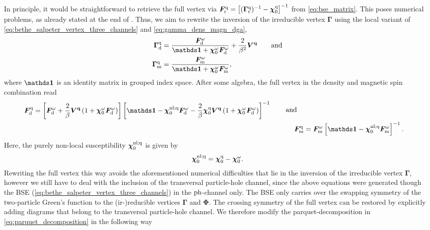 \documentclass[../../main.tex]{subfiles}
\begin{document}
In principle, it would be straightforward to retrieve the full vertex via $\bm F_{\text{r}}^{\text{q}}=\left [(\bm\Gamma_{\text{r}}^{\text{q}})^{-1}-\bm\chi_{0}^{\text{q}}\right ]^{-1}$ from \eqref{eq:bse_matrix}. This poses numerical problems, as already stated at the end of . Thus, we aim to rewrite the inversion of the irreducible vertex $\bm\Gamma$ using the local variant of \eqref{eq:bethe_salpeter_vertex_three_channels} and \eqref{eq:gamma_dens_magn_dga},
\begin{subequations}
\begin{align}
	\bm\Gamma_{\dens}^{\q}&=\frac{\bm F_{\dens}^{\omega}}{\bm\unity+\bm\chi_{0}^{\omega}\bm F_{\dens}^{\omega}}+\frac{2}{\beta^2}\bm V^{\vv{q}}\qqand\\
	\bm\Gamma_{\magn}^{\q}&=\frac{\bm F_{\magn}^{\omega}}{\bm\unity+\bm\chi_{0}^{\omega}\bm F_{\magn}^{\omega}},
\end{align}
\end{subequations}
where $\bm\unity$ is an identity matrix in grouped index space. After some algebra, the full vertex in the density and magnetic spin combination read
\begin{subequations}
\begin{align}
\begin{split}
	\bm F_{\dens}^{\q}&=\left [\bm F_{\dens}^{\omega}+\frac{2}{\beta}\bm V^{\vv{q}}\left (1+\bm\chi_{0}^{\omega}\bm F_{\dens}^{\omega}\right )\right ]\left [\bm\unity-\bm\chi_{0}^{\nl;\q}\bm F_{\dens}^{\omega}-\frac{2}{\beta}\bm\chi_{0}^{\q}\bm V^{\vv{q}}\left (1+\bm\chi_{0}^{\omega}\bm F_{\dens}^{\omega}\right )\right ]^{-1}
\end{split}\;\quad\text{and}\quad\\
	\bm F_{\magn}^{\q}&=\bm F_{\magn}^{\omega}\left [\bm\unity-\bm\chi_{0}^{\nl;\q}\bm F_{\magn}^{\omega}\right ]^{-1}.
\end{align}
\end{subequations}
Here, the purely non-local susceptibility $\bm\chi_{0}^{\text{nl};\text{q}}$ is given by
\begin{align}
	\bm\chi_{0}^{\text{nl};\text{q}}=\bm\chi_{0}^{\text{q}}-\bm\chi_{0}^{\omega}.
\end{align}
Rewriting the full vertex this way avoids the aforementioned numerical difficulties that lie in the inversion of the irreducible vertex $\bm\Gamma$, however we still have to deal with the inclusion of the transversal particle-hole channel, since the above equations were generated though the BSE (\ref{eq:bethe_salpeter_vertex_three_channels}) in the $\text{ph}$-channel only. The BSE only carries over the swapping symmetry of the two-particle Green's function to the (ir-)reducible vertices $\bm\Gamma$ and $\bm\Phi$. The crossing symmetry of the full vertex can be restored by explicitly adding diagrams that belong to the transversal particle-hole channel. We therefore modify the parquet-decomposition in \eqref{eq:parquet_decomposition} in the following way
\end{document}
